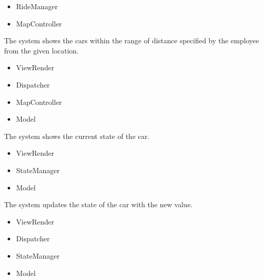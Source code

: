 \documentclass[11pt,a4paper]{report}
\begin{document}
\begin{Req}
			\begin{itemize}
				\item RideManager
				\item MapController
			\end{itemize}
		\item The system shows the cars within the range of distance specified by the employee from the given location.
			\begin{itemize}
				\item ViewRender
				\item Dispatcher
				\item MapController
				\item Model
			\end{itemize}
		\item The system shows the current state of the car.
			\begin{itemize}
				\item ViewRender
				\item StateManager
				\item Model
			\end{itemize}
		\item The system updates the state of the car with the new value.
			\begin{itemize}
				\item ViewRender
				\item Dispatcher
				\item StateManager
				\item Model
			\end{itemize}
	\end{Req}
\end{document}
